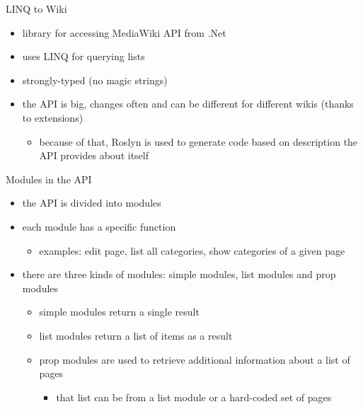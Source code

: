 \documentclass{beamer}
\begin{document}
 

\begin{frame}{LINQ to Wiki}
\begin{itemize}
\item library for accessing MediaWiki API from .Net
\item uses LINQ for querying lists
\item strongly-typed (no magic strings)
\item the API is big, changes often and can be different for different wikis (thanks to extensions)
\begin{itemize}
\item because of that, Roslyn is used to generate code based on description the API provides about itself
\end{itemize}
\end{itemize}
\end{frame}

\begin{frame}{Modules in the API}
\begin{itemize}
\item the API is divided into modules
\item each module has a specific function
\begin{itemize}
\item examples: edit page, list all categories, show categories of a given page
\end{itemize}
\item there are three kinds of modules: simple modules, list modules and prop modules
\begin{itemize}
\item simple modules return a single result
\item list modules return a list of items as a result
\item prop modules are used to retrieve additional information about a list of pages
\begin{itemize}
\item that list can be from a list module or a hard-coded set of pages
\end{itemize}
\end{itemize}
\end{itemize}
\end{frame}

\newlength\codeheight
\setlength\codeheight{10cm}
\end{document}
